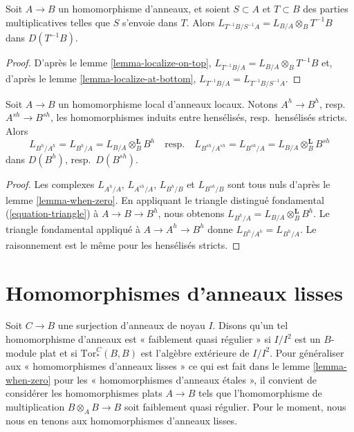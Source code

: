 \begin{lemma}
\label{lemma-localize}
Soit $A \to B$ un homomorphisme d'anneaux, et soient $S \subset A$ et
$T \subset B$ des parties multiplicatives telles que $S$ s'envoie dans $T$.
Alors $L_{T^{-1}B/S^{-1}A} = L_{B/A} \otimes_B T^{-1}B$ dans $D(T^{-1}B)$.
\end{lemma}

\begin{proof}
D'après le lemme \ref{lemma-localize-on-top},
$L_{T^{-1}B/A} = L_{B/A} \otimes_B T^{-1}B$
et, d'après le lemme \ref{lemma-localize-at-bottom},
$L_{T^{-1}B/A} = L_{T^{-1}B/S^{-1}A}$.
\end{proof}

\begin{lemma}
\label{lemma-cotangent-complex-henselization}
Soit $A \to B$ un homomorphisme local d'anneaux locaux. Notons
$A^h \to B^h$, resp.\ $A^{sh} \to B^{sh}$, les homomorphismes induits entre
hensélisés, resp.\ hensélisés stricts. Alors
$$
L_{B^h/A^h} = L_{B^h/A} = L_{B/A} \otimes_B^\mathbf{L} B^h
\quad\text{resp.}\quad
L_{B^{sh}/A^{sh}} = L_{B^{sh}/A} = L_{B/A} \otimes_B^\mathbf{L} B^{sh}
$$
dans $D(B^h)$, resp.\ $D(B^{sh})$.
\end{lemma}

\begin{proof}
Les complexes $L_{A^h/A}$, $L_{A^{sh}/A}$, $L_{B^h/B}$ et
$L_{B^{sh}/B}$ sont tous nuls d'après le lemme \ref{lemma-when-zero}. En
appliquant le triangle distingué fondamental (\ref{equation-triangle}) à
$A \to B \to B^h$, nous obtenons
$L_{B^h/A} = L_{B/A} \otimes_B^\mathbf{L} B^h$.
Le triangle fondamental appliqué à $A \to A^h \to B^h$ donne
$L_{B^h/A^h} = L_{B^h/A}$. Le raisonnement est le même pour les hensélisés
stricts.
\end{proof}




\section{Homomorphismes d'anneaux lisses}
\label{section-smooth}

\noindent
Soit $C \to B$ une surjection d'anneaux de noyau $I$. Disons qu'un tel
homomorphisme d'anneaux est « faiblement quasi régulier » si $I/I^2$ est un
$B$-module plat et si $\text{Tor}_*^C(B, B)$ est l'algèbre extérieure de
$I/I^2$. Pour généraliser aux « homomorphismes d'anneaux lisses » ce qui est
fait dans le lemme \ref{lemma-when-zero} pour les « homomorphismes d'anneaux
\'etales », il convient de considérer les homomorphismes plats $A \to B$ tels
que l'homomorphisme de multiplication $B \otimes_A B \to B$ soit faiblement
quasi régulier. Pour le moment, nous nous en tenons aux homomorphismes
d'anneaux lisses.

